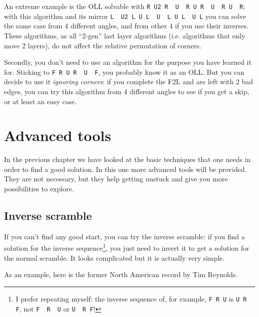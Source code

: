 \documentclass[11pt,a4paper]{book}
\newcommand{\p}{\textquotesingle}
\newcommand{\m}{\texttt}
\newcommand{\ps}{\p\,\,}
\begin{document}
An extreme example is the OLL solvable with \m{R U2 R\ps U\ps R U R\ps U\ps R U\ps R\p}: with this algorithm and its mirror \m{L\ps U2 L U L\ps U\ps L U L\ps U L} you can solve the same case from 4 different angles, and from other 4 if you use their inverses. These algorithms, as all ``2-gen'' last layer algorithms (i.e. algorithms that only move 2 layers), do not affect the relative permutation of corners.

Secondly, you don't need to use an algorithm for the purpose you have learned it for. Sticking to \m{F R U R\ps U\ps F\p}, you probably know it as an OLL. But you can decide to use it \emph{ignoring corners}: if you complete the F2L and are left with 2 bad edges, you can try this algorithm from 4 different angles to see if you get a skip, or at least an easy case.

\chapter{Advanced tools}

In the previous chapter we have looked at the basic techniques that one needs in order to find a good solution. In this one more advanced tools will be provided. They are not necessary, but they help getting unstuck and give you more possibilities to explore.

\section{Inverse scramble}
\label{sec:inverse}

If you can't find any good start, you can try the inverse scramble: if you find a solution for the inverse sequence\footnote{I prefer repeating myself: the inverse sequence of, for example, \m{F R U\p} is \m{U R\ps F\p}, not \m{F\ps R\ps U} or \m{U\ps R F}!}, you just need to invert it to get a solution for the normal scramble. It looks complicated but it is actually very simple.

As an example, here is the former North American record by Tim Reynolds.
\end{document}
